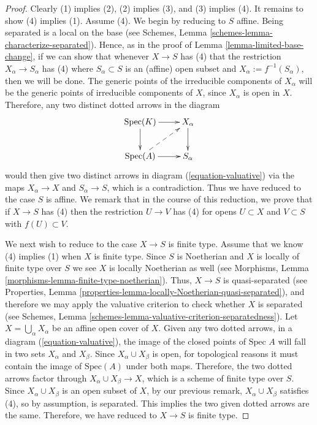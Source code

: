\begin{proof}
Clearly (1) implies (2), (2) implies (3), and (3) implies (4).  It
remains to show (4) implies (1). Assume (4).
We begin by reducing to $S$ affine.  Being separated is a local
on the base (see
Schemes, Lemma \ref{schemes-lemma-characterize-separated}).
Hence, as in the proof of Lemma
\ref{lemma-limited-base-change}, if we can show that whenever
$X \to S$ has (4) that the restriction $X_\alpha \to S_\alpha$ has (4)
where $S_\alpha \subset S$ is an (affine) open subset and $X_\alpha :=
f^{-1}(S_\alpha)$, then we will be done.  The
generic points of the irreducible components of $X_\alpha$ will be the
generic points of irreducible components of $X$, since $X_\alpha$ is
open in $X$.  Therefore, any two distinct dotted arrows in the diagram
\begin{equation}
\xymatrix{
\text{Spec}(K) \ar[r] \ar[d] & X_\alpha \ar[d] \\
\text{Spec}(A) \ar[r] \ar@{-->}[ru] & S_\alpha
}
\end{equation}
would then give two distinct arrows in diagram
(\ref{equation-valuative}) via the maps $X_\alpha \to X$ and
$S_\alpha \to S$, which is a contradiction.  Thus we have reduced
to the case $S$ is affine.  We remark that in the course of this
reduction, we prove that if $X \to S$ has (4) then the restriction $U
\to V$ has (4) for opens $U \subset X$ and $V \subset S$ with
$f(U) \subset V$.

\medskip\noindent
We next wish to reduce to the case $X \to S$ is finite type.  Assume
that we know (4) implies (1) when $X$ is finite type. Since
$S$ is Noetherian and $X$ is locally of finite type over $S$
we see $X$ is locally Noetherian as well (see Morphisms,
Lemma \ref{morphisms-lemma-finite-type-noetherian}).
Thus, $X \to S$ is quasi-separated (see
Properties, Lemma \ref{properties-lemma-locally-Noetherian-quasi-separated}),
and therefore we may apply the valuative criterion to check whether $X$
is separated (see
Schemes, Lemma \ref{schemes-lemma-valuative-criterion-separatedness}).
Let $X = \bigcup_\alpha X_\alpha$ be an affine open
cover of $X$. Given any two dotted arrows, in a diagram
(\ref{equation-valuative}), the image of the closed points of
$\text{Spec } A$ will
fall in two sets $X_\alpha$ and $X_\beta$.  Since $X_\alpha \cup
X_\beta$ is open, for topological reasons it must contain the image of
$\text{Spec}(A)$ under both maps. Therefore, the two dotted arrows factor
through $X_\alpha \cup X_\beta \to X$, which is a scheme of finite type over
$S$. Since $X_\alpha \cup X_\beta$ is an open subset of $X$, by our
previous remark, $X_\alpha \cup X_\beta$ satisfies (4), so by
assumption, is separated.  This implies the two given dotted
arrows are the same. Therefore, we have reduced to $X \to S$ is finite type.


\end{proof}
